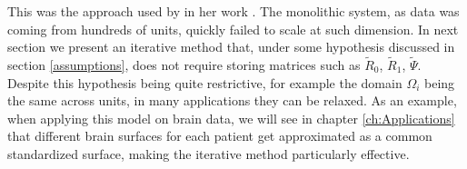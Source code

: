 This was the approach used by \citeauthor{kim} in her work \cite{kim}. The
monolithic system, as data was coming from hundreds of units, quickly failed to
scale at such dimension. In next section we present an iterative method that,
under some hypothesis discussed in section \ref{assumptions}, does not require
storing matrices such as $\tilde{R}_0$, $\tilde{R}_1$, $\tilde{\Psi}$. Despite
this hypothesis being quite restrictive, for example the domain $\Omega_i$
being the same across units, in many applications they can be relaxed. As an
example, when applying this model on brain data, we will see in chapter
\ref{ch:Applications} that different brain surfaces for each patient get
approximated as a common standardized surface, making the iterative method
particularly effective.
